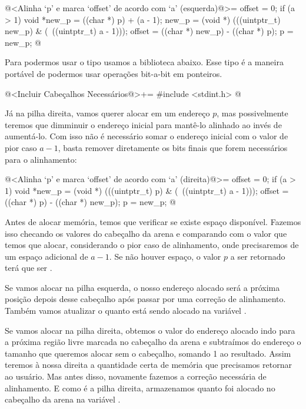 \iniciocodigo
@<Alinha `p' e marca `offset' de acordo com `a' (esquerda)@>=
offset = 0;
if (a > 1){
  void *new_p = ((char *) p) + (a - 1);
  new_p = (void *) (((uintptr_t) new_p) & (~((uintptr_t) a - 1)));
  offset = ((char *) new_p) - ((char *) p);
  p = new_p;
}
@
\fimcodigo

Para podermos usar o tipo  usamos a biblioteca
abaixo. Esse tipo é a maneira portável de podermos usar operações
bit-a-bit em ponteiros.

\iniciocodigo
@<Incluir Cabeçalhos Necessários@>+=
#include <stdint.h>
@
\fimcodigo


Já na pilha direita, vamos querer alocar em um endereço $p$, mas
possivelmente teremos que dimminuir o endereço inicial para mantê-lo
alinhado ao invés de aumentá-lo. Com isso não é necessário somar
o endereço inicial com o valor de pior caso $a-1$, basta remover
diretamente os bits finais que forem necessários para o alinhamento:

\iniciocodigo
@<Alinha `p' e marca `offset' de acordo com `a' (direita)@>=
offset = 0;
if (a > 1){
  void *new_p = (void *) (((uintptr_t) p) & (~((uintptr_t) a - 1)));
  offset = ((char *) p) - ((char *) new_p);
  p = new_p;
}
@
\fimcodigo


Antes de alocar memória, temos que verificar se existe espaço
disponível. Fazemos isso checando os valores do cabeçalho da arena
e comparando com o valor que temos que alocar, considerando o pior
caso de alinhamento, onde precisaremos de um espaço adicional de
$a-1$. Se não houver espaço, o valor $p$ a ser retornado terá que ser
.

Se vamos alocar na pilha esquerda, o nosso endereço alocado será a
próxima posição depois desse cabeçalho após passar por uma correção de
alinhamento. Também vamos atualizar o quanto está sendo alocado na
variável .

Se vamos alocar na pilha direita, obtemos o valor do endereço alocado
indo para a próxima região livre marcada no cabeçalho da arena e
subtraímos do endereço o tamanho que queremos alocar sem o cabeçalho,
somando 1 ao resultado. Assim teremos à nossa direita a quantidade
certa de memória que precisamos retornar ao usuário. Mas antes disso,
novamente fazemos a correção necessária de alinhamento. E como é a
pilha direita, armazenamos quanto foi alocado no cabeçalho da arena na
variável .

